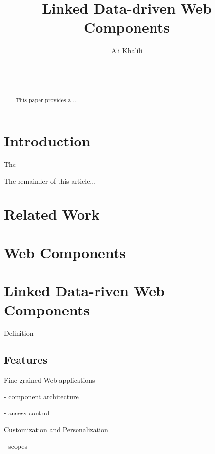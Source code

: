 \documentclass{acm_proc_article-sp}
\begin{document}
\title{Linked Data-driven Web Components}
\subtitle{}

\author{
\alignauthor
Ali Khalili\\
       \\
       \\
       \\
}


\maketitle
\begin{abstract}
This paper provides a ... 
\end{abstract}


\section{Introduction}
The 


The remainder of this article...

\section{Related Work}

\section{Web Components}

\section{Linked Data-riven Web Components}

Definition

\subsection{Features}

Fine-grained Web applications

- component architecture

- access control

Customization and Personalization

- scopes
\end{document}
